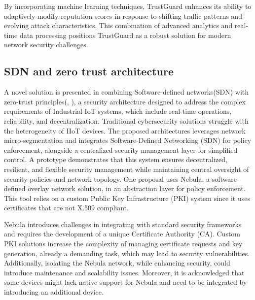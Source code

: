 By incorporating machine learning techniques, TrustGuard enhances its ability to adaptively modify reputation scores in response to shifting traffic patterns and evolving attack characteristics. This combination of advanced analytics and real-time data processing positions TrustGuard as a robust solution for modern network security challenges.

\subsection{SDN and zero trust architecture}
A novel solution is presented in combining Software-defined networks(SDN) with zero-trust principles(\cite{guo2023intelligent}, \cite{zanasi2024flexible}), a security architecture designed to address the complex requirements of Industrial IoT systems, which include real-time operations, reliability, and decentralization. Traditional cybersecurity solutions struggle with the heterogeneity of IIoT devices. The proposed architectures leverages network micro-segmentation and integrates Software-Defined Networking (SDN) for policy enforcement, alongside a centralized security management layer for simplified control. A prototype demonstrates that this system ensures decentralized, resilient, and flexible security management while maintaining central oversight of security policies and network topology. One proposal \cite{zanasi2024flexible} uses Nebula, a software-defined overlay network solution, in an abstraction layer for policy enforcement. This tool relies on a custom Public Key Infrastructure (PKI) system since it uses certificates that are not X.509 compliant. 

Nebula introduces challenges in integrating with standard security frameworks and requires the development of a unique Certificate Authority (CA). Custom PKI solutions increase the complexity of managing certificate requests and key generation, already a demanding task, which may lead to security vulnerabilities. Additionally, isolating the Nebula network, while enhancing security, could introduce maintenance and scalability issues. Moreover, it is acknowledged that some devices might lack native support for Nebula and need to be integrated by introducing an additional device.

